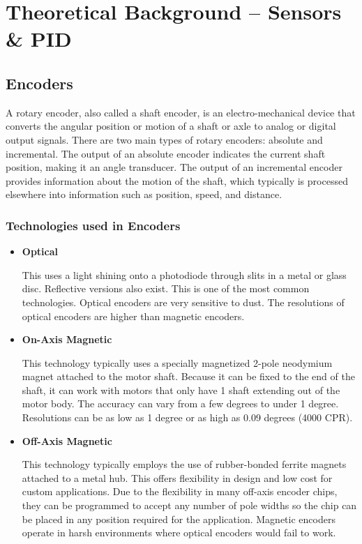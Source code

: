 \newpage
\chapter{Theoretical Background -- Sensors \& PID}
\label{ap:b}

\section{Encoders}
\label{ap:b.enc}
A rotary encoder, also called a shaft encoder, is an electro-mechanical device that converts the angular position or motion of a shaft or axle to analog or digital output signals. There are two main types of rotary encoders: absolute and incremental. The output of an absolute encoder indicates the current shaft position, making it an angle transducer. The output of an incremental encoder provides information about the motion of the shaft, which typically is processed elsewhere into information such as position, speed, and distance.

\subsection{Technologies used in Encoders }
\begin{itemize}
    \item \textbf{Optical} 
    
    This uses a light shining onto a photodiode through slits in a metal or glass disc. Reflective versions also exist. This is one of the most common technologies. Optical encoders are very sensitive to dust. The resolutions of optical encoders are higher than magnetic encoders. 

    \item \textbf{On-Axis Magnetic}
    
    This technology typically uses a specially magnetized 2-pole neodymium magnet attached to the motor shaft. Because it can be fixed to the end of the shaft, it can work with motors that only have 1 shaft extending out of the motor body. The accuracy can vary from a few degrees to under 1 degree. Resolutions can be as low as 1 degree or as high as 0.09 degrees (4000 CPR). 

    \item \textbf{Off-Axis Magnetic} 
    
    This technology typically employs the use of rubber-bonded ferrite magnets attached to a metal hub. This offers flexibility in design and low cost for custom applications. Due to the flexibility in many off-axis encoder chips, they can be programmed to accept any number of pole widths so the chip can be placed in any position required for the application. Magnetic encoders operate in harsh environments where optical encoders would fail to work.
    
\end{itemize}

